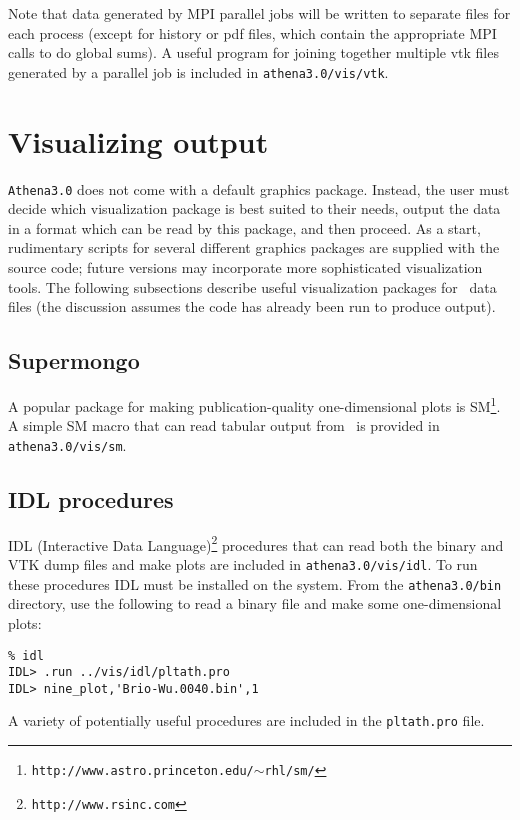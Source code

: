 Note that data generated by MPI parallel jobs will be written to separate files
for each process (except for history or pdf files, which contain the
appropriate MPI calls to do global sums).  A useful program for joining
together multiple vtk files generated by a parallel job is
included in {\tt athena3.0/vis/vtk}.

\section{Visualizing output}

{\tt Athena3.0} does not come with a default graphics package.  Instead,
the user must decide which visualization package is best suited to their
needs, output the data in a format which can be read by this package,
and then proceed.  As a start, rudimentary scripts for several different
graphics packages are supplied with the source code; future versions
may incorporate more sophisticated visualization tools.  The following
subsections describe useful visualization packages for \ath\ data files
(the discussion assumes the code has already been run to produce output).

\subsection{Supermongo}

A popular package for making publication-quality one-dimensional plots
is SM\footnote{{\tt http://www.astro.princeton.edu/$\sim$rhl/sm/}}.  A simple
SM macro that can read tabular output from \ath\ is provided in {\tt
athena3.0/vis/sm}.

\subsection{IDL procedures}

IDL (Interactive Data Language)\footnote{{\tt http://www.rsinc.com}}
procedures that can read both the binary and VTK dump files and make plots
are included in {\tt athena3.0/vis/idl}.  To run these procedures
IDL must be installed on the system.  From the {\tt athena3.0/bin} directory, use
the following to read a binary file and make some one-dimensional plots:
\begin{verbatim}
% idl
IDL> .run ../vis/idl/pltath.pro 
IDL> nine_plot,'Brio-Wu.0040.bin',1
\end{verbatim}
A variety of potentially useful
procedures are included in the {\tt pltath.pro} file.

